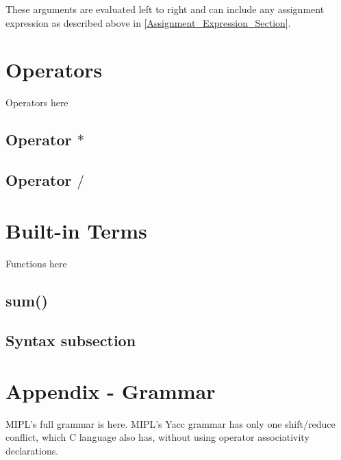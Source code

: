 \documentclass[prodmode,acmtecs]{acmsmall}
\begin{document}
These arguments are evaluated left to right and can include any assignment 
expression as described above in \ref{Assignment_Expression_Section}.

\section{Operators}
Operators here

\subsection{Operator $*$}

\subsection{Operator $/$}

\section{Built-in Terms}
Functions here

\subsection{sum()}

\subsection{Syntax subsection}

\section*{Appendix - Grammar}

MIPL's full grammar is here. MIPL's Yacc grammar has only one shift/reduce conflict, which C language also has, without using operator associativity declarations.


%
%




%
%



\medskip

\end{document}
